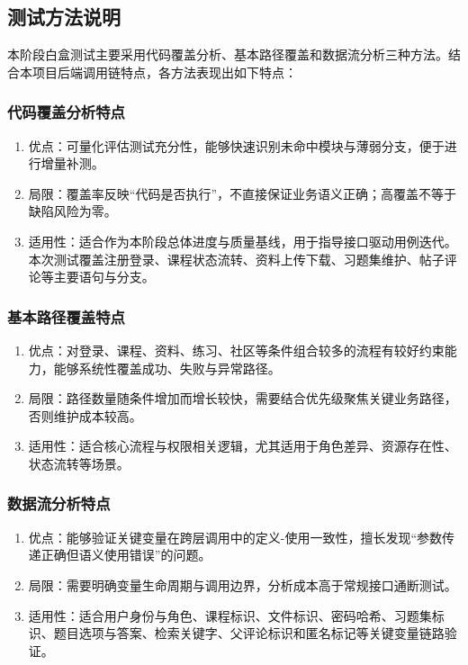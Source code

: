 \documentclass[12pt,a4paper]{ctexart}
\begin{document}
\subsection{测试方法说明}

本阶段白盒测试主要采用代码覆盖分析、基本路径覆盖和数据流分析三种方法。结合本项目后端调用链特点，各方法表现出如下特点：

\subsubsection{代码覆盖分析特点}

\begin{enumerate}
  \item 优点：可量化评估测试充分性，能够快速识别未命中模块与薄弱分支，便于进行增量补测。
  \item 局限：覆盖率反映“代码是否执行”，不直接保证业务语义正确；高覆盖不等于缺陷风险为零。
  \item 适用性：适合作为本阶段总体进度与质量基线，用于指导接口驱动用例迭代。本次测试覆盖注册登录、课程状态流转、资料上传下载、习题集维护、帖子评论等主要语句与分支。
\end{enumerate}

\subsubsection{基本路径覆盖特点}

\begin{enumerate}
  \item 优点：对登录、课程、资料、练习、社区等条件组合较多的流程有较好约束能力，能够系统性覆盖成功、失败与异常路径。
  \item 局限：路径数量随条件增加而增长较快，需要结合优先级聚焦关键业务路径，否则维护成本较高。
  \item 适用性：适合核心流程与权限相关逻辑，尤其适用于角色差异、资源存在性、状态流转等场景。
\end{enumerate}

\subsubsection{数据流分析特点}

\begin{enumerate}
  \item 优点：能够验证关键变量在跨层调用中的定义-使用一致性，擅长发现“参数传递正确但语义使用错误”的问题。
  \item 局限：需要明确变量生命周期与调用边界，分析成本高于常规接口通断测试。
  \item 适用性：适合用户身份与角色、课程标识、文件标识、密码哈希、习题集标识、题目选项与答案、检索关键字、父评论标识和匿名标记等关键变量链路验证。
\end{enumerate}
\end{document}
